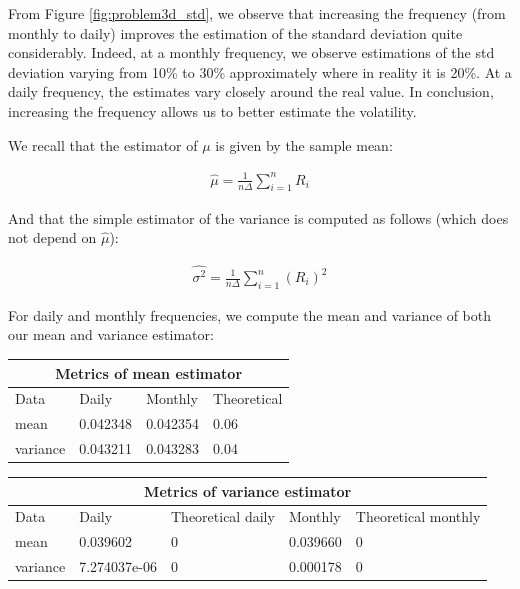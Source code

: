 \documentclass[10pt]{article}
\newenvironment{exercise}[2][Exercise]{\begin{trivlist}
  \item[\hskip \labelsep {\bfseries #1}\hskip \labelsep {\bfseries #2.}]}{\end{trivlist}}
\begin{document}
\begin{exercise}{3}
	\smallbreak
	
	From Figure \ref{fig:problem3d_std}, we observe that increasing the frequency (from monthly to daily) improves the estimation of the standard deviation quite considerably. Indeed, at a monthly frequency, we observe estimations of the std deviation varying from 10\% to 30\% approximately where in reality it is 20\%. At a daily frequency, the estimates vary closely around the real value. In conclusion, increasing the frequency allows us to better estimate the volatility. 
  
	\bigbreak
	
	 We recall that the estimator of $\mu$ is given by the sample mean:
	 
	\begin{align*}
		\hat{\mu} = \frac{1}{n \Delta}\sum^{n}_{i = 1}R_{i}
	\end{align*}
	
	And that the simple estimator of the variance is computed as follows (which does not depend on $\hat{\mu}$):
	
	\begin{align*}
		\hat{\sigma^{2}} = \frac{1}{n \Delta}\sum^{n}_{i = 1}(R_{i})^{2}
	\end{align*}
	 
	 For daily and monthly frequencies, we compute the mean and variance of both our mean and variance estimator:
	 
	 \bigbreak
	 
	 \begin{tabular}{ |p{3cm}||p{3cm}|p{3cm}|p{3cm}| }
		\hline
	 	\multicolumn{4}{|c|}{Metrics of mean estimator} \\
	 	\hline
	 	Data & Daily & Monthly & Theoretical\\
 		\hline
 		mean  &  0.042348 & 0.042354 & 0.06 \\
 		variance & 0.043211 & 0.043283 & 0.04\\
 		\hline
	\end{tabular}
	
	\bigbreak	
	
	\begin{tabular}{ |p{2cm}||p{2cm}|p{3cm}|p{2cm}|p{3cm}| }
		\hline
	 	\multicolumn{5}{|c|}{Metrics of variance estimator} \\
	 	\hline
	 	Data & Daily & Theoretical daily  & Monthly & Theoretical monthly \\
 		\hline
 		mean  &  0.039602 & 0 & 0.039660 & 0 \\
 		variance & 7.274037e-06 & 0 & 0.000178 & 0 \\
 		\hline
	\end{tabular}
	
	\bigbreak
  
  \end{exercise}
\end{document}
